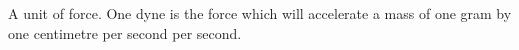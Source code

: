 A unit of force. One dyne is the force which will accelerate a mass of one gram
by one centimetre per second per second.
